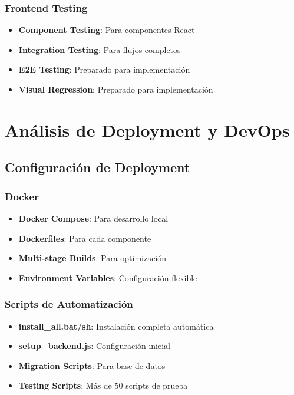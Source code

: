 \documentclass[12pt,a4paper]{article}
\begin{document}
\subsubsection{Frontend Testing}
\begin{itemize}
    \item \textbf{Component Testing}: Para componentes React
    \item \textbf{Integration Testing}: Para flujos completos
    \item \textbf{E2E Testing}: Preparado para implementación
    \item \textbf{Visual Regression}: Preparado para implementación
\end{itemize}

\section{Análisis de Deployment y DevOps}

\subsection{Configuración de Deployment}

\subsubsection{Docker}
\begin{itemize}
    \item \textbf{Docker Compose}: Para desarrollo local
    \item \textbf{Dockerfiles}: Para cada componente
    \item \textbf{Multi-stage Builds}: Para optimización
    \item \textbf{Environment Variables}: Configuración flexible
\end{itemize}

\subsubsection{Scripts de Automatización}
\begin{itemize}
    \item \textbf{install\_all.bat/sh}: Instalación completa automática
    \item \textbf{setup\_backend.js}: Configuración inicial
    \item \textbf{Migration Scripts}: Para base de datos
    \item \textbf{Testing Scripts}: Más de 50 scripts de prueba
\end{itemize}
\end{document}
